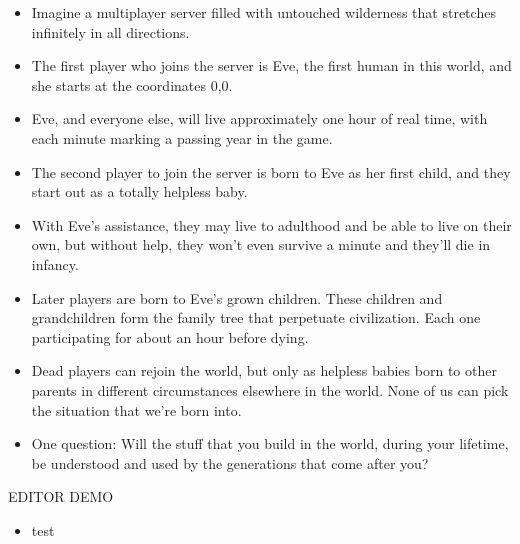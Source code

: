 \documentclass[12pt]{article}
\begin{document}
{\begin{itemize}
\item Imagine a multiplayer server filled with untouched wilderness that stretches infinitely in all directions.

\item The first player who joins the server is Eve, the first human in this world, and she starts at the coordinates 0,0.

\item Eve, and everyone else, will live approximately one hour of real time, with each minute marking a passing year in the game.

\item The second player to join the server is born to Eve as her first child, and they start out as a totally helpless baby.

\item With Eve's assistance, they may live to adulthood and be able to live on their own, but without help, they won't even survive a minute and they'll die in infancy.

\item Later players are born to Eve's grown children.  These children and grandchildren form the family tree that perpetuate civilization.  Each one participating for about an hour before dying.

\item Dead players can rejoin the world, but only as helpless babies born to other parents in different circumstances elsewhere in the world.  None of us can pick the situation that we're born into.

\item One question:  Will the stuff that you build in the world, during your lifetime, be understood and used by the generations that come after you?


\end{itemize}


EDITOR DEMO

\begin{itemize}

\item test
\end{itemize}

}
\end{document}
